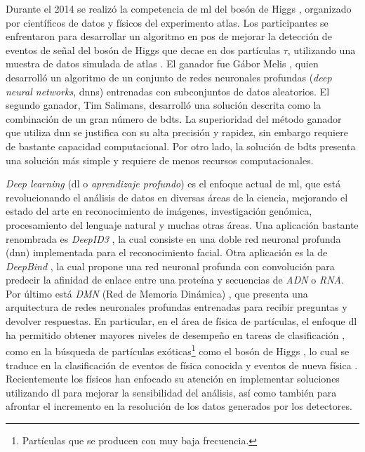 Durante el 2014 se realizó la competencia de \acrshort{ml} del bosón de Higgs \cite{Adam2015}, organizado por científicos de datos y físicos del experimento \acrshort{atlas}. Los participantes se enfrentaron para desarrollar un algoritmo en pos de mejorar la detección de eventos de señal del bosón de Higgs que decae en dos partículas $\tau$, utilizando una muestra de datos simulada de \acrshort{atlas} \cite{MLWP}. El ganador fue Gábor Melis \cite{Melis2015}, quien desarrolló un algoritmo de un conjunto de redes neuronales profundas (\emph{deep neural networks}, \acrshort{dnn}s) entrenadas con subconjuntos de datos aleatorios. El segundo ganador, Tim Salimans, desarrolló una solución descrita como la combinación de un gran número de \acrshort{bdt}s. La superioridad del método ganador que utiliza \acrshort{dnn} se justifica con su alta precisión y rapidez, sin embargo requiere de bastante capacidad computacional. Por otro lado, la solución de \acrshort{bdt}s presenta una solución más simple y requiere de menos recursos computacionales.
%

\emph{Deep learning} (\acrshort{dl} o {\em aprendizaje profundo}) es el enfoque actual de \acrshort{ml}, que está revolucionando el análisis de datos en diversas áreas de la ciencia, mejorando el estado del arte en reconocimiento de imágenes, investigación genómica, procesamiento del lenguaje natural y muchas otras áreas. Una aplicación bastante renombrada es \emph{DeepID3} \cite{Sun2015}, la cual consiste en una doble red neuronal profunda (\acrshort{dnn}) implementada para el reconocimiento facial. Otra aplicación es la de \emph{DeepBind} \cite{Park2015}, la cual propone una red neuronal profunda con convolución para predecir la afinidad de enlace entre una proteína y secuencias de \emph{ADN} o \emph{RNA}. Por último está \emph{DMN} (Red de Memoria Dinámica) \cite{Kumar2016}, que presenta una arquitectura de redes neuronales profundas entrenadas para recibir preguntas y devolver respuestas.
%
En particular, en el área de física de partículas, el enfoque \acrshort{dl} ha permitido obtener mayores niveles de desempeño en tareas de clasificación \cite{Guest2018}, como en la búsqueda de partículas exóticas\footnote{Partículas que se producen con muy baja frecuencia.} como el bosón de Higgs \cite{Baldi2014}, lo cual se traduce en la clasificación de eventos de física conocida y eventos de nueva física \cite{Bhimji2018}. Recientemente los físicos han enfocado su atención en implementar soluciones utilizando \acrshort{dl} para mejorar la sensibilidad del análisis, así como también para afrontar el incremento en la resolución de los datos generados por los detectores.
%

